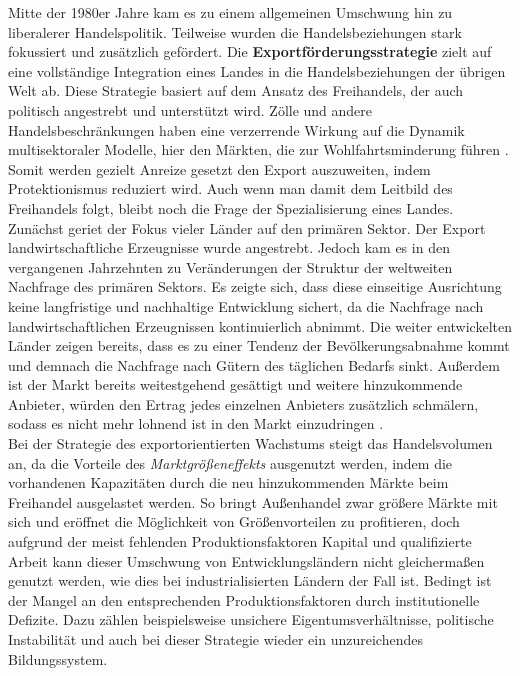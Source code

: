%
Mitte der 1980er Jahre kam es zu einem allgemeinen Umschwung hin zu liberalerer Handelspolitik. Teilweise wurden die Handelsbeziehungen stark fokussiert und zusätzlich gefördert. Die \textbf{Exportförderungsstrategie} zielt auf eine vollständige Integration eines Landes in die Handelsbeziehungen der übrigen Welt ab. Diese Strategie basiert auf dem Ansatz des Freihandels, der auch politisch angestrebt und unterstützt wird. Zölle und andere Handelsbeschränkungen haben eine verzerrende Wirkung auf die Dynamik multisektoraler Modelle, hier den Märkten, die zur Wohlfahrtsminderung führen \cite{Ortigueira.2002}. Somit werden gezielt Anreize gesetzt den Export auszuweiten, indem Protektionismus reduziert wird. Auch wenn man damit dem Leitbild des Freihandels folgt, bleibt noch die Frage der Spezialisierung eines Landes. \\
%
Zunächst geriet der Fokus vieler Länder auf den primären Sektor. Der Export landwirtschaftliche Erzeugnisse wurde angestrebt. Jedoch kam es in den vergangenen Jahrzehnten zu Veränderungen der Struktur der weltweiten Nachfrage des primären Sektors. Es zeigte sich, dass diese einseitige Ausrichtung keine langfristige und nachhaltige Entwicklung sichert, da die Nachfrage nach landwirtschaftlichen Erzeugnissen  kontinuierlich abnimmt. Die weiter entwickelten Länder zeigen bereits, dass es zu einer Tendenz der Bevölkerungsabnahme kommt und demnach die Nachfrage nach Gütern des täglichen Bedarfs sinkt. Außerdem ist der Markt bereits weitestgehend gesättigt und weitere hinzukommende Anbieter, würden den Ertrag jedes einzelnen Anbieters zusätzlich schmälern, sodass es nicht mehr lohnend ist in den Markt einzudringen \cite{Muller.2005,Lachmann.1994}.\\
%
Bei der Strategie des exportorientierten Wachstums steigt das Handelsvolumen an, da die Vorteile des \textit{Marktgrößeneffekts} ausgenutzt werden, indem die vorhandenen Kapazitäten durch die neu hinzukommenden Märkte beim Freihandel ausgelastet werden. 
So bringt Außenhandel zwar größere Märkte mit sich und eröffnet die Möglichkeit von Größenvorteilen zu profitieren, doch aufgrund der meist fehlenden Produktionsfaktoren Kapital und qualifizierte Arbeit kann dieser Umschwung von Entwicklungsländern nicht gleichermaßen genutzt werden, wie dies bei industrialisierten Ländern der Fall ist. Bedingt ist der Mangel an den entsprechenden Produktionsfaktoren durch institutionelle Defizite. Dazu zählen beispielsweise unsichere Eigentumsverhältnisse, politische Instabilität und auch bei dieser Strategie wieder ein unzureichendes Bildungssystem.\\
